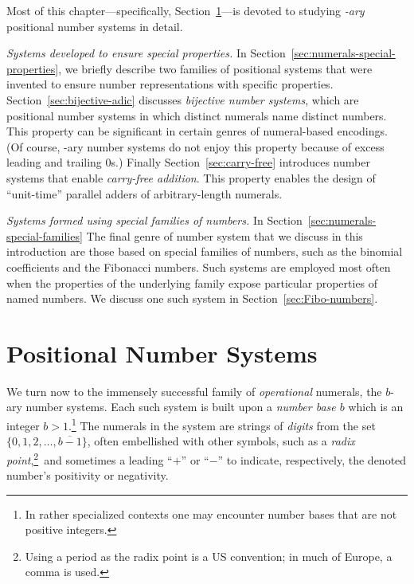 \noindent
Most of this chapter---specifically,
Section~\ref{sec:positional-numbers}---is devoted to studying {\em
  -ary} positional number systems in detail.

\medskip

\noindent
{\it Systems developed to ensure special properties.}
In Section~\ref{sec:numerals-special-properties}, we briefly describe
two families of positional systems that were invented to ensure number
representations with specific properties.  Section~\ref{sec:bijective-adic}
discusses {\em bijective number systems},
which are positional number systems in which distinct numerals name
distinct numbers.  This property can be significant in certain genres
of numeral-based encodings.  (Of course, -ary number systems do not
enjoy this property because of excess leading and trailing $0$s.)
Finally Section~\ref{sec:carry-free} introduces number systems that
enable {\em carry-free addition}.  This property enables the design of
``unit-time'' parallel adders of arbitrary-length numerals.

\medskip

\noindent
{\it Systems formed using special families of numbers.}
%
In Section~\ref{sec:numerals-special-families}
The final genre of number system that we discuss in this introduction
are those based on special families of numbers, such as the binomial
coefficients and the Fibonacci numbers.  Such systems are employed
most often when the properties of the underlying family expose
particular properties of named numbers.  We discuss one such system in
Section~\ref{sec:Fibo-numbers}.


\section{Positional Number Systems}
\label{sec:positional-numbers}

We turn now to the immensely successful family of {\em operational}
numerals, the $b$-ary number systems.  Each such system is built upon
a {\em number base $b$} which is an integer $b> 1$.\footnote{In
  rather specialized contexts one may encounter number bases that are
  not positive integers.}
The numerals in the system are strings of {\it digits} from the set
$\{0, 1, 2, \ldots, \overline{b-1}\}$, often embellished with other
symbols, such as a {\em radix point},\footnote{Using a period as the
  radix point is a US convention; in much of Europe, a comma is
  used.}~and sometimes a leading ``$+$'' or ``$-$'' to indicate,
respectively, the denoted number's positivity or negativity.

